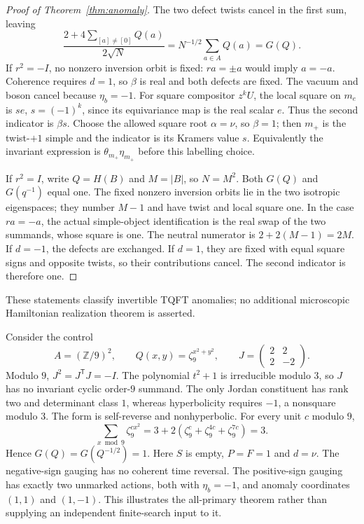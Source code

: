 \documentclass{amsart}
\theoremstyle{definition}\newtheorem{definition}[theorem]{Definition}
\theoremstyle{remark}\newtheorem{remark}[theorem]{Remark}
\newcommand{\Z}{\mathbb Z}\newcommand{\Q}{\mathbb Q}
\begin{document}
\begin{proof}[Proof of Theorem~\ref{thm:anomaly}]
The two defect twists cancel in the first sum, leaving
\[
 \frac{2+4\sum_{[a]\ne[0]}Q(a)}{2\sqrt N}
                  =N^{-1/2}\sum_{a\in A}Q(a)=G(Q).
\]
If $r^2=-I$, no nonzero inversion orbit is fixed: $ra=\pm a$
would imply $a=-a$. Coherence requires $d=1$, so $\beta$ is real
and both defects are fixed. The vacuum and boson cancel because
$\eta_b=-1$. For square compositor $z^kU$, the local square on
$m_e$ is $s e$, $s=(-1)^k$, since its equivariance map is the real
scalar $e$. Thus the second indicator is $\beta s$.
Choose the allowed square root $\alpha=\nu$, so $\beta=1$;
then $m_+$ is the twist-$+1$ simple and the indicator is its
Kramers value $s$. Equivalently the invariant expression is
$\theta_{m_+}\eta_{m_+}$ before this labelling choice.

If $r^2=I$, write $Q=H(B)$ and $M=|B|$, so $N=M^2$.
Both $G(Q)$ and $G(q^{-1})$ equal one. The fixed nonzero
inversion orbits lie in the two isotropic eigenspaces; they number
$M-1$ and have twist and local square one. In the case $ra=-a$,
the actual simple-object identification is the real swap of the
two summands, whose square is one. The neutral numerator is
$2+2(M-1)=2M$. If $d=-1$, the defects are exchanged. If $d=1$,
they are fixed with equal square signs and opposite twists, so
their contributions cancel. The second indicator is therefore one.
\end{proof}

These statements classify invertible TQFT anomalies; no additional
microscopic Hamiltonian realization theorem is asserted.

Consider the control
\begin{equation}\label{eq:example}
 A=(\Z/9)^2,\qquad Q(x,y)=\zeta_9^{x^2+y^2},\qquad
 J=\begin{pmatrix}2&2\\2&-2\end{pmatrix}.
\end{equation}
Modulo $9$, $J^2=J^{\mathsf T}J=-I$. The polynomial $t^2+1$ is
irreducible modulo $3$, so $J$ has no invariant cyclic order-$9$
summand. The only Jordan constituent has rank two and determinant
class $1$, whereas hyperbolicity requires $-1$, a nonsquare modulo
$3$. The form is self-reverse and nonhyperbolic.
For every unit $c$ modulo $9$,
\[
 \sum_{x\bmod9}\zeta_9^{cx^2}
       =3+2(\zeta_9^c+\zeta_9^{4c}+\zeta_9^{7c})=3.
\]
Hence $G(Q)=G(Q^{-1/2})=1$. Here $S$ is empty, $P=F=1$ and
$d=\nu$. The negative-sign gauging has no coherent time reversal.
The positive-sign gauging has exactly two unmarked actions, both
with $\eta_b=-1$, and anomaly coordinates $(1,1)$ and $(1,-1)$.
This illustrates the all-primary theorem rather than supplying
an independent finite-search input to it.
\end{document}
